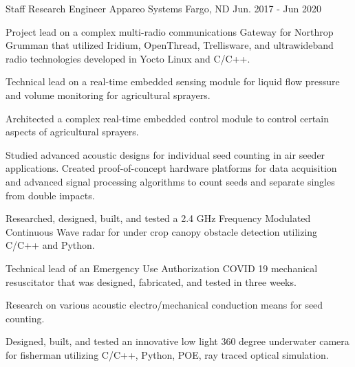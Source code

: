 \begin{cventries}
  \cventry
    {Staff Research Engineer} %
    {Appareo Systems} %
    {Fargo, ND} %
    {Jun. 2017 - Jun 2020} %
    {
      \begin{cvitems} %
        \item {Project lead on a complex multi-radio communications Gateway for Northrop Grumman that utilized Iridium, OpenThread, Trellisware, and ultrawideband radio technologies developed in Yocto Linux and C/C++.}
        \item {Technical lead on a real-time embedded sensing module for liquid flow pressure and volume monitoring for agricultural sprayers.}
        \item {Architected a complex real-time embedded control module to control certain aspects of agricultural sprayers.}
        \item {Studied advanced acoustic designs for individual seed counting in air seeder applications. Created proof-of-concept hardware platforms for data acquisition and advanced signal processing algorithms to count seeds and separate singles from double impacts.}
        \item {Researched, designed, built, and tested a 2.4 GHz Frequency Modulated Continuous Wave radar for under crop canopy obstacle detection utilizing C/C++ and Python.}
        \item {Technical lead of an Emergency Use Authorization COVID 19 mechanical resuscitator that was designed, fabricated, and tested in three weeks.}
        \item {Research on various acoustic electro/mechanical conduction means for seed counting.}
        \item {Designed, built, and tested an innovative low light 360 degree underwater camera for fisherman utilizing C/C++, Python, POE, ray traced optical simulation.}
      \end{cvitems}
    }


\end{cventries}
